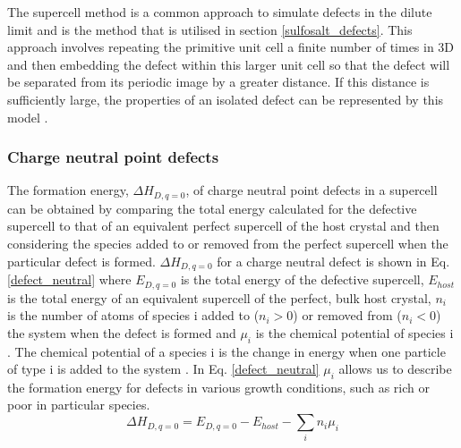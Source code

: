 \documentclass[11pt, twoside]{report}
\begin{document}
The supercell method is a common approach to simulate defects in the dilute limit and is the method that is utilised in section \ref{sulfosalt_defects}. This approach involves repeating the primitive unit cell a finite number of times in 3D and then embedding the defect within this larger unit cell so that the defect will be separated from its periodic image by a greater distance. If this distance is sufficiently large, the properties of an isolated defect can be represented by this model \cite{freysoldt_rev}.

\subsubsection{Charge neutral point defects}
The formation energy, $\Delta H_{D,q=0}$, of charge neutral point defects in a supercell can be obtained by comparing the total energy calculated for the defective supercell to that of an equivalent perfect supercell of the host crystal and then considering the species added to or removed from the perfect supercell when the particular defect is formed. $\Delta H_{D,q=0}$ for a charge neutral defect is shown in Eq. \ref{defect_neutral} where $E_{D,q=0}$ is the total energy of the defective supercell, $E_{host}$ is the total energy of an equivalent supercell of the perfect, bulk host crystal, $n_i$ is the number of atoms of species i added to ($n_i > 0 $) or removed from ($n_i < 0$) the system when the defect is formed and $\mu_i$ is the chemical potential of species i \cite{ZhangNorthup_defect_formation}. The chemical potential of a species i is the change in energy when one particle of type i is added to the system \cite{chem_pot}. In Eq. \ref{defect_neutral} $\mu_i$ allows us to describe the formation energy for defects in various growth conditions, such as rich or poor in particular species.
\begin{equation}\label{defect_neutral}
\Delta H_{D,q=0} = E_{D,q=0} - E_{host} - \sum_i n_i \mu_i
\end{equation}
\end{document}
